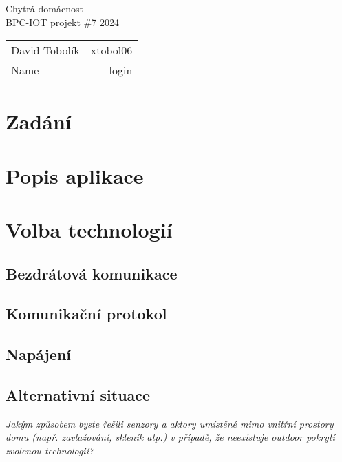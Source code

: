 \documentclass[a4paper, 12pt]{article}
\begin{document}
\begin{titlepage}
	\centering


	{\Huge Chytrá domácnost\\[0.4em]
		\LARGE BPC-IOT projekt \#7 2024}


	\begin{table}[H]
		\hfill
		\begin{tabularx}{0.3\textwidth}{Xr}
			David Tobolík & xtobol06 \\
			Name          & login    \\
		\end{tabularx}
	\end{table}
\end{titlepage}

\tableofcontents
\newpage

\section{Zadání}
\section{Popis aplikace}


\section{Volba technologií}
\subsection{Bezdrátová komunikace}
\subsection{Komunikační protokol}
\subsection{Napájení}


\subsection{Alternativní situace}
\textit{
	Jakým způsobem byste řešili senzory a aktory umístěné mimo vnitřní prostory
	domu (např. zavlažování, skleník atp.) v případě, že neexistuje outdoor pokrytí
	zvolenou technologií?
}
\end{document}

